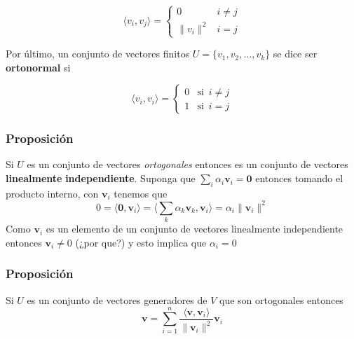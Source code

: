 \documentclass[
]{article}
\begin{document}
\[
\langle v_i, v_j \rangle = \begin{cases}
                                    0 & i\ne j\\
                                    \|v_i\|^2 & i=j
                            \end{cases}
\]

Por último, un conjunto de vectores finitos
\(U=\{v_1,v_2,\ldots, v_k\}\) se dice ser \textbf{ortonormal} si

\begin{equation}
 \langle v_i , v_i \rangle = \begin{cases} 
                                                0 & \mbox{si }\, i\ne j \\
                                                1 & \mbox{si }\, i = j
                                            \end{cases}
\end{equation}

\hypertarget{proposiciuxf3n}{%
\subsubsection{Proposición}\label{proposiciuxf3n}}

Si \(U\) es un conjunto de vectores \emph{ortogonales} entonces es un
conjunto de vectores \textbf{linealmente} \textbf{independiente}.
Suponga que \(\sum_i \alpha_i\mathbf{v}_i=\mathbf{0}\) entonces tomando
el producto interno, con \(\mathbf{v}_i\) tenemos que \[
0=\langle \mathbf{0}, \mathbf{v}_i \rangle = \langle \sum_{k}\alpha_k\mathbf{v}_k, \mathbf{v}_i\rangle = \alpha_i\|\mathbf{v}_i\|^2
\] Como \(\mathbf{v}_i\) es un elemento de un conjunto de vectores
linealmente independiente entonces \(\mathbf{v}_i\ne 0\) (¿por que?) y
esto implica que \(\alpha_i=0\)

\hypertarget{proposiciuxf3n-1}{%
\subsubsection{Proposición}\label{proposiciuxf3n-1}}

Si \(U\) es un conjunto de vectores generadores de \(V\) que son
ortogonales entonces \[
\mathbf{v}=\sum_{i=1}^n \frac{\langle \mathbf{v},\mathbf{v}_i \rangle}{\|\mathbf{v}_i\|^2}\mathbf{v}_i
\]
\end{document}
